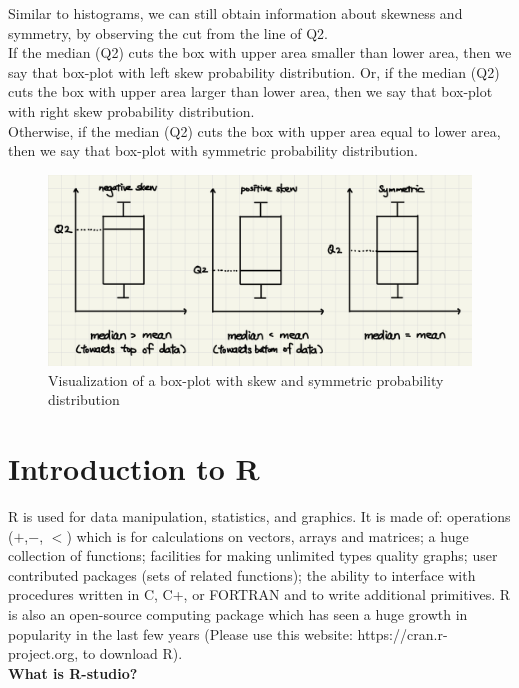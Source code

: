 Similar to histograms, we can still obtain information about skewness and symmetry, by observing the cut from the line of Q2.\\

If the median (Q2) cuts the box with upper area smaller than lower area, then we say that box-plot with left skew probability distribution. Or, if the median (Q2) cuts the box with upper area larger than lower area, then we say that box-plot with right skew probability distribution.\\

Otherwise, if the median (Q2) cuts the box with upper area equal to lower area, then we say that box-plot with symmetric probability distribution.

\begin{figure}[H]
 \centering
 \includegraphics[scale=0.15]{Section1/img/Bskew.jpg}
 \caption{Visualization of a box-plot with skew and symmetric probability distribution}
\end{figure}

\section{Introduction to R}

R is used for data manipulation, statistics, and graphics. It is made of: operations ($+$,$ -$, $<$) which is for calculations on vectors, arrays and matrices; a huge collection of functions; facilities for making unlimited types quality graphs; user contributed packages (sets of related functions); the ability to interface with procedures written in C, C+, or FORTRAN and to write additional primitives. R is also an open-source computing package which has seen a huge growth in popularity in the last few years (Please use this website: https://cran.r-project.org, to download R).\\

\textbf{What is R-studio?}


